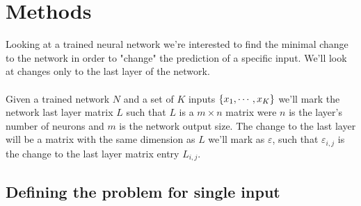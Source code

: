 \documentclass[a4paper]{easychair}
\begin{document}
\cite{KaBaDiJuKo17Reluplex,KaHuIbJuLaLiShThWuZeDiKoBa19Marabou}

\section{Methods}
\label{sec:methods}

Looking at a trained neural network we're interested to find the minimal change to the network in order to "change" the prediction of a specific input. We'll look at changes only to the last layer of the network.
\\\\
Given a trained network $N$ and a set of $K$ inputs $\left\lbrace x_1,\cdots,x_K\right\rbrace$ we'll mark the network last layer matrix $L$ such that $L$ is a $m\times n$ matrix were $n$ is the layer's number of neurons and $m$ is the network output size. The change to the last layer will be a matrix with the same dimension as $L$ we'll mark as $\varepsilon$, such that $\varepsilon_{i,j}$ is the change to the last layer matrix entry $L_{i,j}$. 

\subsection{Defining the problem for single input}
\label{sec:defineProblem1}
\end{document}
